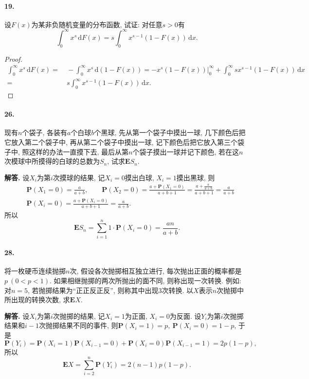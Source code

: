 \documentclass[12pt, a4paper, oneside]{ctexart}
\newenvironment{solution}{\par\noindent\textbf{解答. }}{\bigskip\par}
\def\d{\mathrm{d}}      %
\def\P{\textbf{P}}      %
\def\E{\textbf{E}}      %
\def\del{\vspace{-3.5ex}}  %
\begin{document}
\paragraph{19.}设$F(x)$为某非负随机变量的分布函数, 试证: 对任意$s > 0$有
\begin{equation*}
    \int_0^\infty x^s\,\d F(x) = s\int_0^{\infty}x^{s-1}(1-F(x))\,\d x.
\end{equation*}
\begin{proof}
    \begin{align*}
        \int_0^\infty x^s\,\d F(x) =&\ -\int_0^{\infty}x^s\,\d(1-F(x)) = -x^s(1-F(x))\biggl|_0^{\infty}+\int_0^\infty s x^{s-1}(1-F(x))\,\d x\\ =&\ s\int_0^\infty x^{s-1}(1-F(x))\,\d x.
    \end{align*}
\end{proof}
\paragraph{26.}现有$n$个袋子, 各装有$a$个白球$b$个黑球, 先从第一个袋子中摸出一球, 几下颜色后把它放入第二个袋子中, 再从第二个袋子中摸出一球, 记下颜色后把它放入第三个袋子中, 照这样的办法一直摸下去, 最后从第$n$个袋子摸出一球并记下颜色, 若在这$n$次模球中所摸得的白球的总数为$S_n$, 试求$\E S_n$.
\begin{solution}
    设$X_i$为第$i$次摸球的结果, 记$X_i=0$摸出白球, $X_i = 1$摸出黑球, 则
    \begin{align*}
        &\ \P(X_1 = 0) = \frac{a}{a+b},\qquad \P(X_2 = 0) = \frac{a+\P(X_1 = 0)}{a+b+1} = \frac{a + \frac{a}{a+b}}{a+b+1} = \frac{a}{a+b}\\
        &\ \P(X_i = 0) = \frac{a+\P(X_i = 0)}{a+b+1} = \frac{a}{a+b}.
    \end{align*}
    所以
    \begin{equation*}
        \E S_n = \sum_{i=1}^n1\cdot \P(X_i = 0) = \frac{an}{a+b}.
    \end{equation*}
\end{solution}\del
\paragraph{28.}将一枚硬币连续抛掷$n$次, 假设各次抛掷相互独立进行, 每次抛出正面的概率都是$p\ (0 < p < 1)$. 如果相继抛掷的两次所抛出的面不同, 则称出现一次转换. 例如: 对$n=5$, 若抛掷结果为“正正反正反”, 则称其中出现$3$次转换. 以$X$表示$n$次抛掷中所出现的转换次数, 求$\E X$.
\begin{solution}
    设$X_i$为第$i$次抛掷的结果, 记$X_i = 1$为正面, $X_i = 0$为反面. 设$Y_i$为第$i$次抛掷结果和$i-1$次抛掷结果不同的事件, 则$\P(X_i = 1) = p,\ \P(X_i = 0 ) =1-p$, 于是
    \begin{equation*}
        \P(Y_i) = \P(X_i = 1)\P(X_{i-1} = 0)+\P(X_i = 0)\P(X_{i-1} = 1) = 2p(1-p),
    \end{equation*}
    所以
    \begin{equation*}
        \E X = \sum_{i=2}^n\P(Y_i) = 2(n-1)p(1-p).
    \end{equation*}
\end{solution}\del
\end{document}
